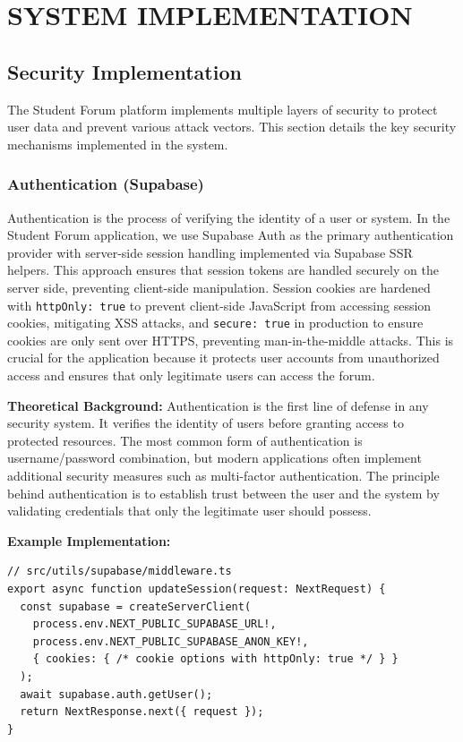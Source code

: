 \chapter*{SYSTEM IMPLEMENTATION}

\section{Security Implementation}

The Student Forum platform implements multiple layers of security to protect user data and prevent various attack vectors. This section details the key security mechanisms implemented in the system.

\subsection{Authentication (Supabase)}

Authentication is the process of verifying the identity of a user or system. In the Student Forum application, we use Supabase Auth as the primary authentication provider with server-side session handling implemented via Supabase SSR helpers. This approach ensures that session tokens are handled securely on the server side, preventing client-side manipulation. Session cookies are hardened with \texttt{httpOnly: true} to prevent client-side JavaScript from accessing session cookies, mitigating XSS attacks, and \texttt{secure: true} in production to ensure cookies are only sent over HTTPS, preventing man-in-the-middle attacks. This is crucial for the application because it protects user accounts from unauthorized access and ensures that only legitimate users can access the forum.

\textbf{Theoretical Background:} Authentication is the first line of defense in any security system. It verifies the identity of users before granting access to protected resources. The most common form of authentication is username/password combination, but modern applications often implement additional security measures such as multi-factor authentication. The principle behind authentication is to establish trust between the user and the system by validating credentials that only the legitimate user should possess.

\textbf{Example Implementation:}
\begin{verbatim}
// src/utils/supabase/middleware.ts
export async function updateSession(request: NextRequest) {
  const supabase = createServerClient(
    process.env.NEXT_PUBLIC_SUPABASE_URL!,
    process.env.NEXT_PUBLIC_SUPABASE_ANON_KEY!,
    { cookies: { /* cookie options with httpOnly: true */ } }
  );
  await supabase.auth.getUser();
  return NextResponse.next({ request });
}
\end{verbatim}

